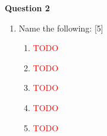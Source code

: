 \newpage
\par
\noindent
\textbf{Question 2}\\
\begin{enumerate}[label=(\roman*)]

    \item Name the following: \hfill [5]
        \begin{enumerate}[label=(\alph*)]
            \setlength\itemsep{0em}
            \item \textcolor{red}{TODO} 
            \item \textcolor{red}{TODO} 
            \item \textcolor{red}{TODO} 
            \item \textcolor{red}{TODO} 
            \item \textcolor{red}{TODO} 
        \end{enumerate}

\end{enumerate}

